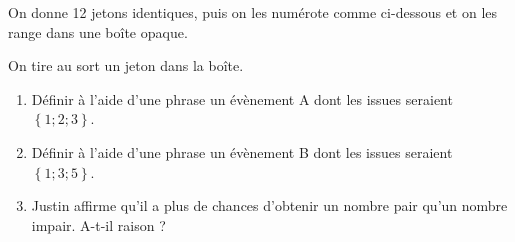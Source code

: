On donne 12 jetons identiques, puis on les numérote comme ci-dessous et on les range dans une boîte opaque.

\begin{center}
\end{center}

On tire au sort un jeton dans la boîte.
\begin{enumerate}
    \item Définir à l'aide d'une phrase un évènement A dont les issues seraient $\left\{ 1;2;3 \right\}$.
    \item Définir à l'aide d'une phrase un évènement B dont les issues seraient $\left\{ 1;3;5 \right\}$.
    \item Justin affirme qu'il a plus de chances d'obtenir un nombre pair qu'un nombre impair. A-t-il raison ?
\end{enumerate}